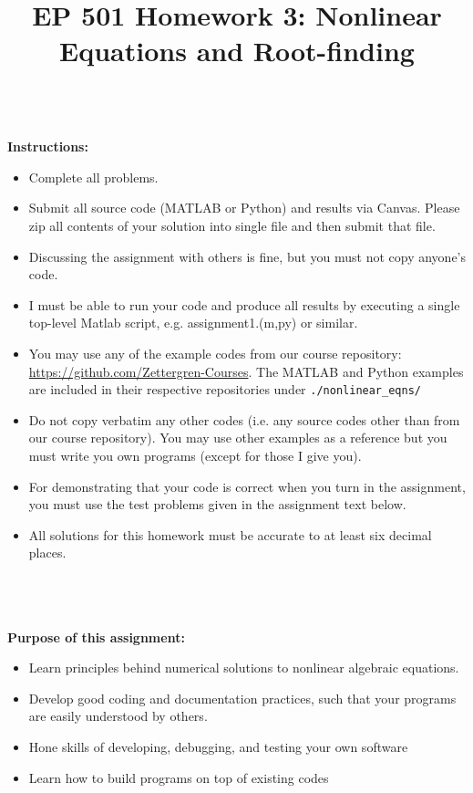 \documentclass{article}
\begin{document}
\title{EP 501 Homework 3:  Nonlinear Equations and Root-finding}

\maketitle

~\\
\textbf{Instructions:}  
\begin{itemize}
  \item Complete all problems.
  \item Submit all source code (MATLAB or Python) and results via Canvas.  Please zip all contents of your solution into single file and then submit that file.    
  \item Discussing the assignment with others is fine, but you must not copy anyone's code.  
  \item I must be able to run your code and produce all results by executing a single top-level Matlab script, e.g. \textsf{assignment1.(m,py)} or similar.  
  \item You may use any of the example codes from our course repository:  \url{https://github.com/Zettergren-Courses}.  The MATLAB and Python examples are included in their respective repositories under \texttt{./nonlinear\_eqns/}
  \item Do not copy verbatim any other codes (i.e. any source codes other than from our course repository).  You may use other examples as a reference but you must write you own programs (except for those I give you).  
    \item For demonstrating that your code is correct when you turn in the assignment, you must use the test problems given in the assignment text below.  
    \item  All solutions for this homework must be accurate to at least six decimal places.  

\end{itemize}
~\\~\\~\\
\textbf{Purpose of this assignment:}  
\begin{itemize}
  \item Learn principles behind numerical solutions to nonlinear algebraic equations.  
  \item Develop good coding and documentation practices, such that your programs are easily understood by others.  
  \item Hone skills of developing, debugging, and testing your own software
  \item Learn how to build programs on top of existing codes
\end{itemize}
\end{document}
